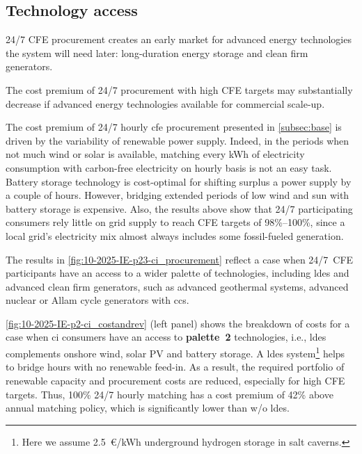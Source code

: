 \subsection{Technology access}
\label{subsec:palette}

\begin{res}
    24/7 CFE procurement creates an early market for advanced energy technologies the system will need later: long-duration energy storage and clean firm generators.
\end{res}

\begin{res}
    The cost premium of 24/7 procurement with high CFE targets may substantially decrease if advanced energy technologies available for commercial scale-up. 
\end{res}

The cost premium of 24/7 hourly \gls{cfe} procurement presented in \cref{subsec:base} is driven by the variability of renewable power supply.
Indeed, in the periods when not much wind or solar is available, matching every kWh of electricity consumption with carbon-free electricity on hourly basis is not an easy task.
Battery storage technology is cost-optimal for shifting surplus a power supply by a couple of hours.
However, bridging extended periods of low wind and sun with battery storage is expensive.
Also, the results above show that 24/7 participating consumers rely little on grid supply to reach CFE targets of 98\%--100\%, since a local grid's electricity mix almost always includes some fossil-fueled generation.

The results in \cref{fig:10-2025-IE-p23-ci_procurement} reflect a case when 24/7~CFE participants have an access to a wider palette of technologies, including \gls{ldes} and advanced clean firm generators, such as advanced geothermal systems, advanced nuclear or Allam cycle generators with \gls{ccs}.

\cref{fig:10-2025-IE-p2-ci_costandrev} (left panel) shows the breakdown of costs for a case when \gls{ci} consumers have an access to \textbf{palette~2} technologies, i.e., \gls{ldes} complements onshore wind, solar PV and battery storage.
A \gls{ldes} system\footnote{Here we assume 2.5~\euro/kWh underground hydrogen storage in salt caverns.} helps to bridge hours with no renewable feed-in. 
As a result, the required portfolio of renewable capacity and procurement costs are reduced, especially for high CFE targets.
Thus, 100\% 24/7 hourly matching has a cost premium of 42\% above annual matching policy, which is significantly lower than w/o \gls{ldes}.

